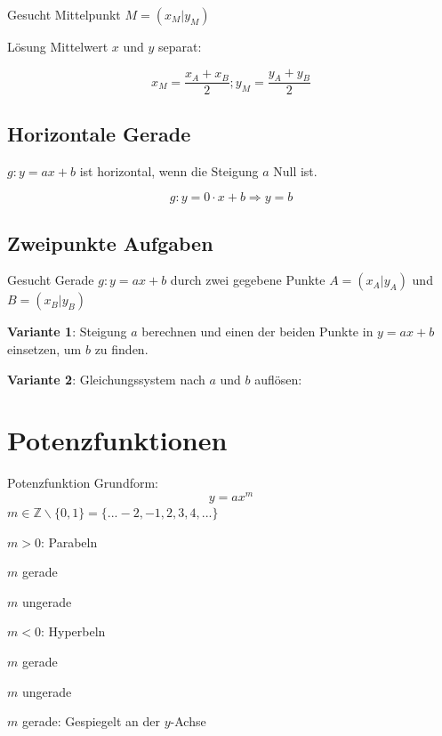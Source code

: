 \begin{multicols}{2}
Gesucht Mittelpunkt $M=(x_M|y_M)$

Lösung Mittelwert $x$ und $y$ separat:

$$x_M = \frac{x_A+x_B}2; y_M=\frac{y_A+y_B}2$$

\subsection*{Horizontale Gerade}

$g: y=ax+b$ ist horizontal, wenn die Steigung $a$ Null ist.

$$g:  y=0\cdot{}x+b \Rightarrow y=b$$

\subsection*{Zweipunkte Aufgaben}
Gesucht Gerade $g: y=ax+b$ durch zwei gegebene Punkte $A=(x_A|y_A)$
und $B=(x_B|y_B)$

\textbf{Variante 1}: Steigung $a$ berechnen und einen der beiden Punkte in
$y=ax+b$ einsetzen, um $b$ zu finden.

\textbf{Variante 2}: Gleichungssystem nach $a$ und $b$ auf\/lösen:

\hrulefill

\section*{Potenzfunktionen}

\begin{definition*}{Potenzfunktion}{}
Grundform:
$$y=ax^m$$
$m\in\mathbb{Z}\backslash\{0,1\} = \{...-2, -1, 2, 3, 4, ...\}$
\end{definition*}

$m>0$: Parabeln

$m$ gerade


$m$ ungerade


$m<0$: Hyperbeln

$m$ gerade

$m$ ungerade



$m$ gerade: Gespiegelt an der $y$-Achse


\end{multicols}
